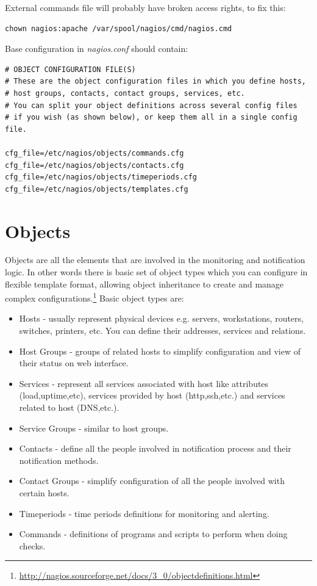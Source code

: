 \documentclass[10pt,a4paper,final]{report}
\begin{document}
External commands file will probably have broken access rights, to fix this:
\begin{lstlisting}
chown nagios:apache /var/spool/nagios/cmd/nagios.cmd
\end{lstlisting}
Base configuration in \emph{nagios.conf} should contain:
\begin{lstlisting}
# OBJECT CONFIGURATION FILE(S)
# These are the object configuration files in which you define hosts,
# host groups, contacts, contact groups, services, etc.
# You can split your object definitions across several config files
# if you wish (as shown below), or keep them all in a single config file.

cfg_file=/etc/nagios/objects/commands.cfg
cfg_file=/etc/nagios/objects/contacts.cfg
cfg_file=/etc/nagios/objects/timeperiods.cfg
cfg_file=/etc/nagios/objects/templates.cfg
\end{lstlisting}

\section{Objects}
Objects are all the elements that are involved in the monitoring and notification logic. In other words there is basic set of object types which you can configure in flexible template format, allowing object inheritance to create and manage complex configurations.\footnote{\url{http://nagios.sourceforge.net/docs/3\_0/objectdefinitions.html}} Basic object types are:
\begin{itemize}
\item Hosts - usually represent physical devices e.g. servers, workstations, routers, switches, printers, etc. You can define their addresses, services and relations.
\item Host Groups - groups of related hosts to simplify configuration and view of their status on web interface.
\item Services - represent all services associated with host like attributes (load,uptime,etc), services provided by host (http,ssh,etc.) and services related to host (DNS,etc.).
\item Service Groups - similar to host groups.
\item Contacts - define all the people involved in notification process and their notification methods.
\item Contact Groups - simplify configuration of all the people involved with certain hosts.
\item Timeperiods - time periods definitions for monitoring and alerting.
\item Commands - definitions of programs and scripts to perform when doing checks.
\end{itemize}
\end{document}
